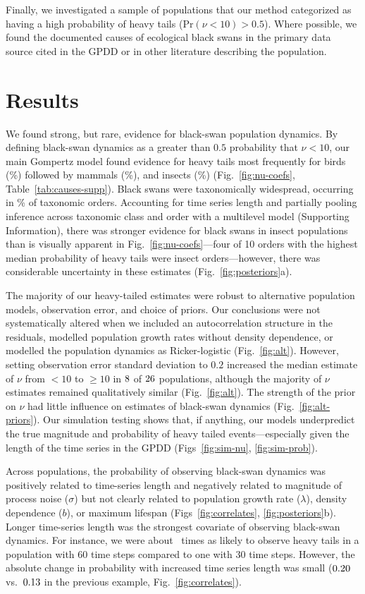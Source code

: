 Finally, we investigated a sample of populations that our method categorized as
having a high probability of heavy tails (Pr$(\nu < 10) > 0.5$). Where
possible, we found the documented causes of ecological black swans in the
primary data source cited in the GPDD or in other literature describing the
population.

\section{Results}

We found strong, but rare, evidence for black-swan population dynamics. By
defining black-swan dynamics as a greater than $0.5$ probability that $\nu <
10$, our main Gompertz model found evidence for heavy tails most frequently
for birds (\birdPH\%) followed by mammals (\mammalsPH\%), and insects
(\insectsPH\%) (Fig.~\ref{fig:nu-coefs}, Table~\ref{tab:causes-supp}). Black
swans were taxonomically widespread, occurring in \POrdersHeavy\% of taxonomic
orders. Accounting for time series length and partially pooling inference
across taxonomic class and order with a multilevel model (Supporting
Information), there was stronger evidence for black swans in insect
populations than is visually apparent in Fig.~\ref{fig:nu-coefs}---four of 10
orders with the highest median probability of heavy tails were insect
orders---however, there was considerable uncertainty in these estimates
(Fig.~\ref{fig:posteriors}a).

The majority of our heavy-tailed estimates were robust to alternative
population models, observation error, and choice of priors. Our conclusions
were not systematically altered when we included an autocorrelation structure
in the residuals, modelled population growth rates without density dependence,
or modelled the population dynamics as Ricker-logistic (Fig.~\ref{fig:alt}).
However, setting observation error standard deviation to $0.2$ increased the
median estimate of $\nu$ from $<10$ to $\ge 10$ in $8$ of
$26$ populations, although the majority of $\nu$ estimates remained
qualitatively similar (Fig.~\ref{fig:alt}). The strength of the prior on $\nu$
had little influence on estimates of black-swan dynamics
(Fig.~\ref{fig:alt-priors}). Our simulation testing shows that, if anything,
our models underpredict the true magnitude and probability of heavy tailed
events---especially given the length of the time series in the GPDD
(Figs~\ref{fig:sim-nu}, \ref{fig:sim-prob}).

Across populations, the probability of observing black-swan dynamics was
positively related to time-series length and negatively related to magnitude of
process noise ($\sigma$) but not clearly related to population growth rate
($\lambda$), density dependence ($b$), or maximum lifespan
(Figs~\ref{fig:correlates}, \ref{fig:posteriors}b). Longer time-series length
was the strongest covariate of observing black-swan dynamics. For instance, we
were about \pIncHeavyNThirtyNSixty~times as likely to observe heavy tails in a
population with 60 time steps compared to one with 30 time steps. However, the
absolute change in probability with increased time series length was small
($0.20$ vs.\ $0.13$ in the previous example,
Fig.~\ref{fig:correlates}).

